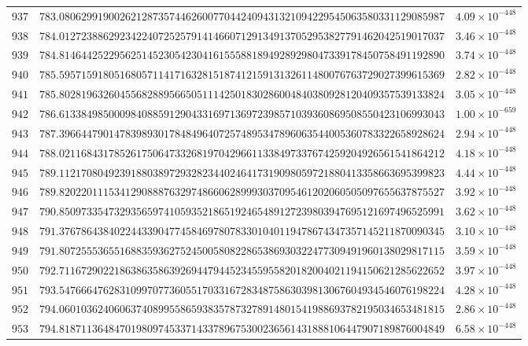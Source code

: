 \documentclass[12pt,reqno]{amsart}
\theoremstyle{remark}
\begin{document}
\begin{longtable}{clc}
$937$ & $783.0806299190026212873574462600770442409431321094229545063580331129085987$ & $4.09\times 10^{-448}$ \\
$938$ & $784.0127238862923422407252579141466071291349137052953827791462042519017037$ & $3.46\times 10^{-448}$ \\
$939$ & $784.8146442522956251452305423041615558818949289298047339178450758491192890$ & $3.74\times 10^{-448}$ \\
$940$ & $785.5957159180516805711417163281518741215913132611480076763729027399615369$ & $2.82\times 10^{-448}$ \\
$941$ & $785.8028196326045568288956650511142501830286004840380928120409357539133824$ & $3.05\times 10^{-448}$ \\
$942$ & $786.6133849850009840885912904331697136972398571039360869508550423106993043$ & $1.00\times 10^{-659}$ \\
$943$ & $787.3966447901478398930178484964072574895347896063544005360783322658928624$ & $2.94\times 10^{-448}$ \\
$944$ & $788.0211684317852617506473326819704296611338497337674259204926561541864212$ & $4.18\times 10^{-448}$ \\
$945$ & $789.1121708049239188038972932823440246417319098059721880413358663695399823$ & $4.44\times 10^{-448}$ \\
$946$ & $789.8202201115341290888763297486606289993037095461202060505097655637875527$ & $3.92\times 10^{-448}$ \\
$947$ & $790.8509733547329356597410593521865192465489127239803947695121697496525991$ & $3.62\times 10^{-448}$ \\
$948$ & $791.3767864384022443390477458469780783301040119478674347357145211870090345$ & $3.10\times 10^{-448}$ \\
$949$ & $791.8072555365516883593627524500580822865386930322477309491960138029817115$ & $3.59\times 10^{-448}$ \\
$950$ & $792.7116729022186386358639269447944523455955820182004021194150621285622652$ & $3.97\times 10^{-448}$ \\
$951$ & $793.5476664762831099707736055170331672834875863039813067604934546076198224$ & $4.28\times 10^{-448}$ \\
$952$ & $794.0601036240606374089955865938357873278914801541988693782195034653481815$ & $2.86\times 10^{-448}$ \\
$953$ & $794.8187113648470198097453371433789675300236561431888106447907189876004849$ & $6.58\times 10^{-448}$ \\

\end{longtable}
\end{document}
